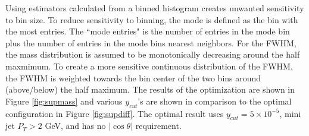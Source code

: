 Using estimators calculated from a binned histogram creates unwanted sensitivity to bin size. To reduce sensitivity to binning, the mode is defined as the bin with the most entries. The ``mode entries" is the number of entries in the mode bin plus the number of entries in the mode bins nearest neighbors. For the FWHM, the mass distribution is assumed to be monotonically decreasing around the half maxmimum. To create a more sensitive continuous distribution of the FWHM,  the FWHM is weighted towards the bin center of the two bins around (above/below) the half maximum. The results of the optimization are shown in Figure \ref{fig:supmass} and various $y_{cut}$'s are shown in comparison to the optimal configuration in Figure \ref{fig:supdiff}. The optimal result uses $y_{cut} = 5\times 10^{-5}$, mini jet $P_T > 2$ GeV, and has no $|\cos \theta|$ requirement. 

